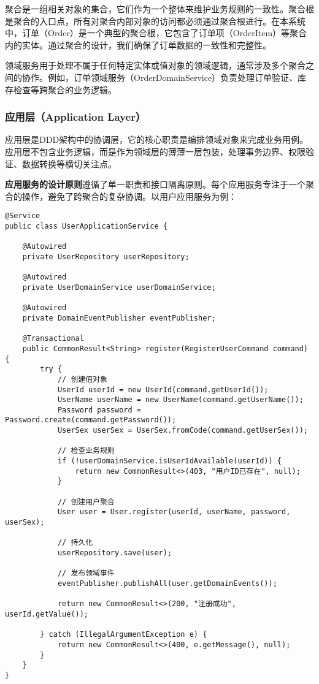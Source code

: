 \documentclass[a4paper,12pt]{article}
\begin{document}
聚合是一组相关对象的集合，它们作为一个整体来维护业务规则的一致性。聚合根是聚合的入口点，所有对聚合内部对象的访问都必须通过聚合根进行。在本系统中，订单（Order）是一个典型的聚合根，它包含了订单项（OrderItem）等聚合内的实体。通过聚合的设计，我们确保了订单数据的一致性和完整性。

领域服务用于处理不属于任何特定实体或值对象的领域逻辑，通常涉及多个聚合之间的协作。例如，订单领域服务（OrderDomainService）负责处理订单验证、库存检查等跨聚合的业务逻辑。

\subsubsection{应用层（Application Layer）}

应用层是DDD架构中的协调层，它的核心职责是编排领域对象来完成业务用例。应用层不包含业务逻辑，而是作为领域层的薄薄一层包装，处理事务边界、权限验证、数据转换等横切关注点。

\textbf{应用服务的设计原则}遵循了单一职责和接口隔离原则。每个应用服务专注于一个聚合的操作，避免了跨聚合的复杂协调。以用户应用服务为例：

\begin{lstlisting}[caption=UserApplicationService核心方法]
@Service
public class UserApplicationService {
    
    @Autowired
    private UserRepository userRepository;
    
    @Autowired
    private UserDomainService userDomainService;
    
    @Autowired
    private DomainEventPublisher eventPublisher;
    
    @Transactional
    public CommonResult<String> register(RegisterUserCommand command) {
        try {
            // 创建值对象
            UserId userId = new UserId(command.getUserId());
            UserName userName = new UserName(command.getUserName());
            Password password = Password.create(command.getPassword());
            UserSex userSex = UserSex.fromCode(command.getUserSex());
            
            // 检查业务规则
            if (!userDomainService.isUserIdAvailable(userId)) {
                return new CommonResult<>(403, "用户ID已存在", null);
            }
            
            // 创建用户聚合
            User user = User.register(userId, userName, password, userSex);
            
            // 持久化
            userRepository.save(user);
            
            // 发布领域事件
            eventPublisher.publishAll(user.getDomainEvents());
            
            return new CommonResult<>(200, "注册成功", userId.getValue());
            
        } catch (IllegalArgumentException e) {
            return new CommonResult<>(400, e.getMessage(), null);
        }
    }
}
\end{lstlisting}
\end{document}
